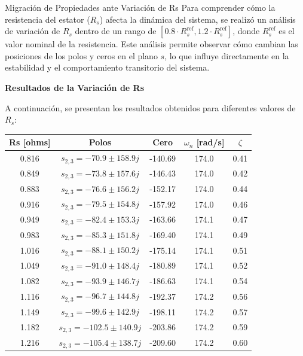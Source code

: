 \documentclass[12pt]{beamer}
\begin{document}
\begin{frame}{Migración de Propiedades ante Variación de Rs} \scriptsize
Para comprender cómo la resistencia del estator (\( R_s \)) afecta la dinámica del sistema, se realizó un análisis de variación de \( R_s \) dentro de un rango de \([0.8 \cdot R_s^{\text{ref}}, 1.2 \cdot R_s^{\text{ref}}]\), donde \( R_s^{\text{ref}} \) es el valor nominal de la resistencia. Este análisis permite observar cómo cambian las posiciones de los polos y ceros en el plano \( s \), lo que influye directamente en la estabilidad y el comportamiento transitorio del sistema.

\textbf{Resultados de la Variación de Rs}

A continuación, se presentan los resultados obtenidos para diferentes valores de \( R_s \):

\begin{table}[H]
    \centering
    \label{tab:variacion_Rs}
    \begin{tabular}{|c|c|c|c|c|}
        \hline
        \textbf{Rs [ohms]} & \textbf{Polos} & \textbf{Cero} & \textbf{\(\omega_n\) [rad/s]} & \textbf{\(\zeta\)} \\
        \hline
        0.816 & $s_{2,3} = -70.9 \pm 158.9j$ & -140.69 & 174.0 & 0.41 \\
        \hline
        0.849 & $s_{2,3} = -73.8 \pm 157.6j$ & -146.43 & 174.0 & 0.42 \\
        \hline
        0.883 & $s_{2,3} = -76.6 \pm 156.2j$ & -152.17 & 174.0 & 0.44 \\
        \hline
        0.916 & $s_{2,3} = -79.5 \pm 154.8j$ & -157.92 & 174.0 & 0.46 \\
        \hline
        0.949 & $s_{2,3} = -82.4 \pm 153.3j$ & -163.66 & 174.1 & 0.47 \\
        \hline
        0.983 & $s_{2,3} = -85.3 \pm 151.8j$ & -169.40 & 174.1 & 0.49 \\
        \hline
        1.016 & $s_{2,3} = -88.1 \pm 150.2j$ & -175.14 & 174.1 & 0.51 \\
        \hline
        1.049 & $s_{2,3} = -91.0 \pm 148.4j$ & -180.89 & 174.1 & 0.52 \\
        \hline
        1.082 & $s_{2,3} = -93.9 \pm 146.7j$ & -186.63 & 174.1 & 0.54 \\
        \hline
        1.116 & $s_{2,3} = -96.7 \pm 144.8j$ & -192.37 & 174.2 & 0.56 \\
        \hline
        1.149 & $s_{2,3} = -99.6 \pm 142.9j$ & -198.11 & 174.2 & 0.57 \\
        \hline
        1.182 & $s_{2,3} = -102.5 \pm 140.9j$ & -203.86 & 174.2 & 0.59 \\
        \hline
        1.216 & $s_{2,3} = -105.4 \pm 138.7j$ & -209.60 & 174.2 & 0.60 \\
        \hline
    \end{tabular}
\end{table}
\end{frame}
\end{document}
